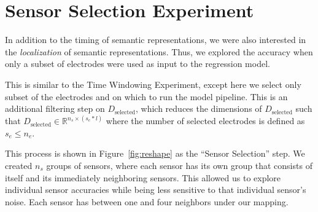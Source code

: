 \section{Sensor Selection Experiment}

In addition to the timing of semantic representations, we were also interested 
in the \emph{localization} of semantic representations. Thus, we explored the 
\tvt accuracy when only a subset of electrodes were used as input to the 
regression model. 

This is similar to the Time Windowing Experiment, except here we select only 
subset of the electrodes and on which to run the model pipeline. This is an 
additional filtering step on $D_{\text{selected}}$, which reduces the 
dimensions of $D_\text{selected}$ such that $D_\text{selected} \in 
\mathbb{R}^{n_s \times (s_e * l)}$ where the number of selected electrodes is 
defined as $s_e \leq n_e$. 

This process is shown in Figure~\ref{fig:reshape} as the ``Sensor Selection'' 
step. We created $n_s$ groups of sensors, where each sensor has its own group 
that consists of itself and its immediately neighboring sensors. This allowed 
us to explore individual sensor accuracies while being less sensitive to that 
individual sensor's noise. Each sensor has between one and four neighbors under 
our mapping.
